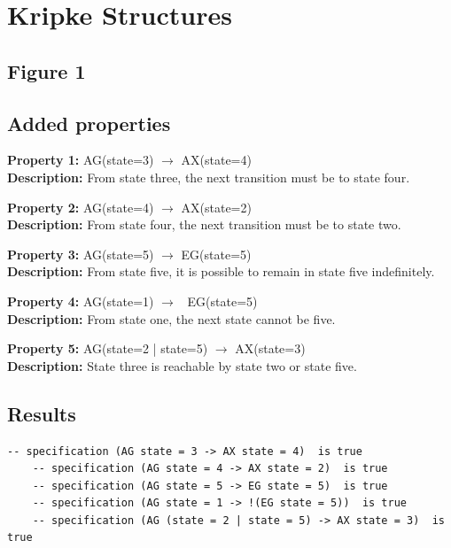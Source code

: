 \documentclass[11pt]{article}
\begin{document}
\section{Kripke Structures} 

\subsection{Figure 1}
	\subsection{Added properties}
	
		\textbf{Property 1:} 	AG(state=3) $\to$ AX(state=4) 	\\	
		\textbf{Description:} From state three, the next transition must be to state four. \\
		\vspace{12pt}
		
		\textbf{Property 2:} AG(state=4) $\to$ AX(state=2)\\ 
		\textbf{Description:} From state four, the next transition must be to state two. \\
		\vspace{12pt}
		
		\textbf{Property 3:} 	AG(state=5) $\to$ EG(state=5)\\ 
		\textbf{Description:} From state five, it is possible to remain in state five indefinitely. \\
		\vspace{12pt}
		
		\textbf{Property 4:} AG(state=1) $\to$ ~EG(state=5) \\
		\textbf{Description:} From state one, the next state cannot be five.\\
		\vspace{12pt}
		
		\textbf{Property 5:} AG(state=2 | state=5) $\to$ AX(state=3)  \\
		\textbf{Description:} State three is reachable by state two or state five.\\
	
	
	\subsection{Results}
	
	\begin{lstlisting}[caption=NuSMV Kripke Diagram Output, label=p2_1_out]	
	-- specification (AG state = 3 -> AX state = 4)  is true
	-- specification (AG state = 4 -> AX state = 2)  is true
	-- specification (AG state = 5 -> EG state = 5)  is true
	-- specification (AG state = 1 -> !(EG state = 5))  is true
	-- specification (AG (state = 2 | state = 5) -> AX state = 3)  is true
	\end{lstlisting}
	
\end{document}

